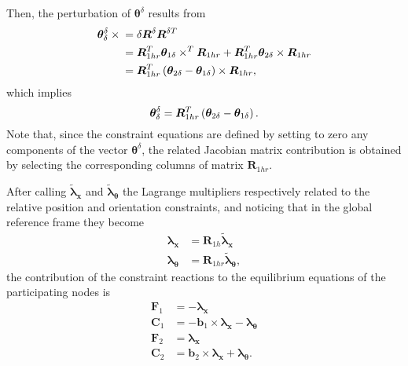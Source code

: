 \documentclass[10pt,dvips,fleqn,subeqn]{report}
\newcommand{\T}[1]{\bm{#1}}
\begin{document}
Then, the perturbation of $\T{\theta}^{\delta}$ results from
\begin{align}
	\T{\theta}^{\delta}_{\delta} \times{}
	&= \delta\T{R}^{\delta} \T{R}^{\delta T} \nonumber \\
	&= \T{R}_{1hr}^T \T{\theta}_{1\delta}\times^T \T{R}_{1hr}
	+ \T{R}_{1hr}^T \T{\theta}_{2\delta}\times \T{R}_{1hr} \nonumber \\
	&= \T{R}_{1hr}^T \plbr{
		\T{\theta}_{2\delta} - \T{\theta}_{1\delta}
	} \times \T{R}_{1hr} ,
\end{align}
which implies
\begin{equation}
	\T{\theta}^{\delta}_{\delta} = \T{R}_{1hr}^T \plbr{
		\T{\theta}_{2\delta} - \T{\theta}_{1\delta}
	} .
\end{equation}
Note that, since the constraint equations are defined by setting 
to zero any components of the vector $\T{\theta}^{\delta}$, the
related Jacobian matrix contribution is obtained by selecting 
the corresponding columns of matrix $\T{R}_{1hr}$.


After calling $\tilde{\T{\lambda}}_{\T{x}}$
and $\tilde{\T{\lambda}}_{\T{\theta}}$ the Lagrange multipliers
respectively related to the relative position and orientation
constraints, and noticing that in the global reference frame
they become
\begin{subequations}
\begin{align}
	\T{\lambda}_{\T{x}} &= \T{R}_{1h} \tilde{\T{\lambda}}_{\T{x}} \\
	\T{\lambda}_{\T{\theta}} &= \T{R}_{1hr} \tilde{\T{\lambda}}_{\T{\theta}} ,
\end{align}
\end{subequations}
the contribution of the constraint reactions to the equilibrium equations
of the participating nodes is
\begin{subequations}
\begin{align}
	\T{F}_1 &= - \T{\lambda}_{\T{x}} \\
	\T{C}_1 &= - \T{b}_1 \times \T{\lambda}_{\T{x}} - \T{\lambda}_{\T{\theta}} \\
	\T{F}_2 &= \T{\lambda}_{\T{x}} \\
	\T{C}_2 &= \T{b}_2 \times \T{\lambda}_{\T{x}} + \T{\lambda}_{\T{\theta}} .
\end{align}
\end{subequations}
\end{document}
